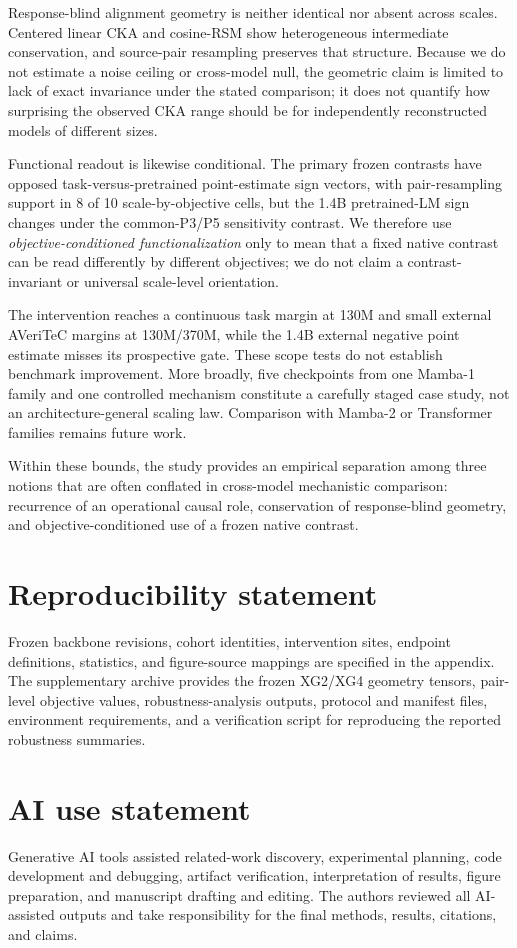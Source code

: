 \documentclass{article}
\begin{document}
Response-blind alignment geometry is neither identical nor absent across scales. Centered linear CKA and cosine-RSM show heterogeneous intermediate conservation, and source-pair resampling preserves that structure. Because we do not estimate a noise ceiling or cross-model null, the geometric claim is limited to lack of exact invariance under the stated comparison; it does not quantify how surprising the observed CKA range should be for independently reconstructed models of different sizes.

Functional readout is likewise conditional. The primary frozen contrasts have opposed task-versus-pretrained point-estimate sign vectors, with pair-resampling support in 8 of 10 scale-by-objective cells, but the 1.4B pretrained-LM sign changes under the common-P3/P5 sensitivity contrast. We therefore use \emph{objective-conditioned functionalization} only to mean that a fixed native contrast can be read differently by different objectives; we do not claim a contrast-invariant or universal scale-level orientation.

The intervention reaches a continuous task margin at 130M and small external AVeriTeC margins at 130M/370M, while the 1.4B external negative point estimate misses its prospective gate. These scope tests do not establish benchmark improvement. More broadly, five checkpoints from one Mamba-1 family and one controlled mechanism constitute a carefully staged case study, not an architecture-general scaling law. Comparison with Mamba-2 or Transformer families remains future work.

Within these bounds, the study provides an empirical separation among three notions that are often conflated in cross-model mechanistic comparison: recurrence of an operational causal role, conservation of response-blind geometry, and objective-conditioned use of a frozen native contrast.

\label{paper:main-end}
\section*{Reproducibility statement}
Frozen backbone revisions, cohort identities, intervention sites, endpoint definitions, statistics, and figure-source mappings are specified in the appendix. The supplementary archive provides the frozen XG2/XG4 geometry tensors, pair-level objective values, robustness-analysis outputs, protocol and manifest files, environment requirements, and a verification script for reproducing the reported robustness summaries.
\section*{AI use statement}
Generative AI tools assisted related-work discovery, experimental planning, code development and debugging, artifact verification, interpretation of results, figure preparation, and manuscript drafting and editing. The authors reviewed all AI-assisted outputs and take responsibility for the final methods, results, citations, and claims.
\label{paper:references-start}


\clearpage
\appendix

\end{document}
